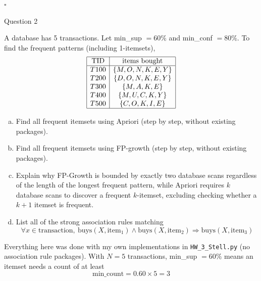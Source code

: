\documentclass[12pt,letterpaper, onecolumn]{exam}
\begin{document}
\begin{questions}
\begin{solution}
        $\square$
    \end{solution}

    \newpage
    \question Question 2

    A database has 5 transactions. Let min\_sup $=60\%$ and min\_conf $=80\%$. To find the frequent patterns (including 1-itemsets),
    \begin{equation*}
        \begin{array}{|c|c|}
            \hline \text{TID} & \text{items bought} \\ \hline
            T100 & \{M, O, N, K, E, Y\} \\
            T200 & \{D, O, N, K, E, Y\} \\
            T300 & \{M, A, K, E\} \\
            T400 & \{M, U, C, K, Y\} \\
            T500 & \{C, O, K, I, E\} \\ \hline
        \end{array}
    \end{equation*}
    \begin{enumerate}[a.)]
        \item Find all frequent itemsets using Apriori (step by step, without existing packages).
        \item Find all frequent itemsets using FP-growth (step by step, without existing packages).
        \item Explain why FP-Growth is bounded by exactly two database scans regardless of the length of the longest frequent pattern, while Apriori requires $k$ database scans to discover a frequent $k$-itemset, excluding checking whether a $k+1$ itemset is frequent.
        \item List all of the strong association rules matching
        \begin{equation*}
            \forall x\in\text{transaction},\ \text{buys}(X,\text{item}_1)\wedge\text{buys}(X,\text{item}_2)\Rightarrow\text{buys}(X,\text{item}_3)
        \end{equation*}
    \end{enumerate}

    \begin{solution}

        Everything here was done with my own implementations in \texttt{HW\_3\_Stell.py} (no association rule packages). With $N=5$ transactions, min\_sup $=60\%$ means an itemset needs a count of at least
        \begin{equation*}
            \text{min\_count} = 0.60\times 5 = 3
        \end{equation*}


\end{solution}
\end{questions}
\end{document}
